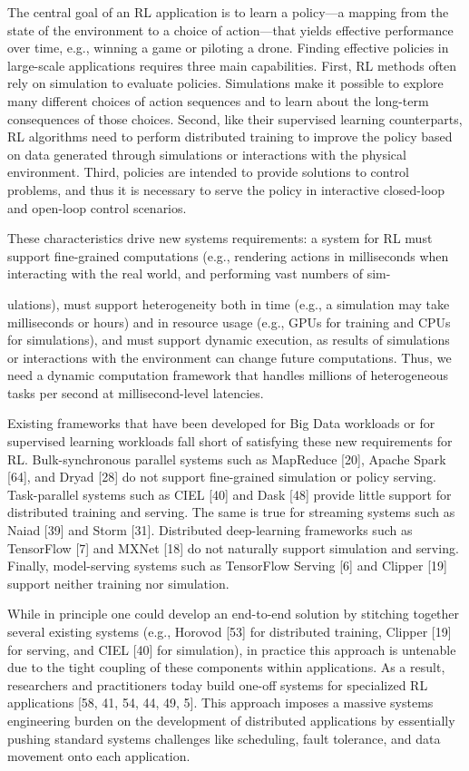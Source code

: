 \documentclass[
]{article}
\begin{document}
The central goal of an RL application is to learn a policy---a mapping
from the state of the environment to a choice of action---that yields
effective performance over time, e.g., winning a game or piloting a
drone. Finding effective policies in large-scale applications requires
three main capabilities. First, RL methods often rely on simulation to
evaluate policies. Simulations make it possible to explore many
different choices of action sequences and to learn about the long-term
consequences of those choices. Second, like their supervised learning
counterparts, RL algorithms need to perform distributed training to
improve the policy based on data generated through simulations or
interactions with the physical environment. Third, policies are intended
to provide solutions to control problems, and thus it is necessary to
serve the policy in interactive closed-loop and open-loop control
scenarios.

These characteristics drive new systems requirements: a system for RL
must support fine-grained computations (e.g., rendering actions in
milliseconds when interacting with the real world, and performing vast
numbers of sim-

ulations), must support heterogeneity both in time (e.g., a simulation
may take milliseconds or hours) and in resource usage (e.g., GPUs for
training and CPUs for simulations), and must support dynamic execution,
as results of simulations or interactions with the environment can
change future computations. Thus, we need a dynamic computation
framework that handles millions of heterogeneous tasks per second at
millisecond-level latencies.

Existing frameworks that have been developed for Big Data workloads or
for supervised learning workloads fall short of satisfying these new
requirements for RL. Bulk-synchronous parallel systems such as MapReduce
{[}20{]}, Apache Spark {[}64{]}, and Dryad {[}28{]} do not support
fine-grained simulation or policy serving. Task-parallel systems such as
CIEL {[}40{]} and Dask {[}48{]} provide little support for distributed
training and serving. The same is true for streaming systems such as
Naiad {[}39{]} and Storm {[}31{]}. Distributed deep-learning frameworks
such as TensorFlow {[}7{]} and MXNet {[}18{]} do not naturally support
simulation and serving. Finally, model-serving systems such as
TensorFlow Serving {[}6{]} and Clipper {[}19{]} support neither training
nor simulation.

While in principle one could develop an end-to-end solution by stitching
together several existing systems (e.g., Horovod {[}53{]} for
distributed training, Clipper {[}19{]} for serving, and CIEL {[}40{]}
for simulation), in practice this approach is untenable due to the tight
coupling of these components within applications. As a result,
researchers and practitioners today build one-off systems for
specialized RL applications {[}58, 41, 54, 44, 49, 5{]}. This approach
imposes a massive systems engineering burden on the development of
distributed applications by essentially pushing standard systems
challenges like scheduling, fault tolerance, and data movement onto each
application.
\end{document}
